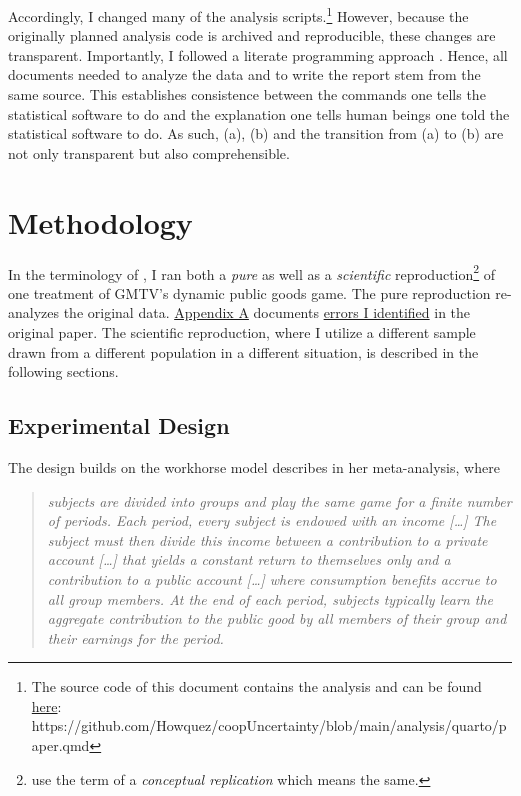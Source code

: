 \documentclass[
  authoryear,
  preprint,
  3p]{elsarticle}
\begin{document}
Accordingly, I changed many of the analysis scripts.\footnote{The source
  code of this document contains the analysis and can be found
  \href{https://github.com/Howquez/coopUncertainty/blob/main/analysis/quarto/paper.qmd}{here}:
  https://github.com/Howquez/coopUncertainty/blob/main/analysis/quarto/paper.qmd}
However, because the originally planned analysis code is archived and
reproducible, these changes are transparent. Importantly, I followed a
literate programming approach \citep{Knuth_1984, AkhtarYe_2023}. Hence,
all documents needed to analyze the data and to write the report stem
from the same source. This establishes consistence between the commands
one tells the statistical software to do and the explanation one tells
human beings one told the statistical software to do. As such, (a), (b)
and the transition from (a) to (b) are not only transparent but also
comprehensible.

\hypertarget{sec-methods}{%
\section{Methodology}\label{sec-methods}}

In the terminology of \citet{Hamermesh2007}, I ran both a \emph{pure} as
well as a \emph{scientific} reproduction\footnote{\citet{Parsons2022}
  use the term of a \emph{conceptual replication} which means the same.}
of one treatment of GMTV's dynamic public goods game. The pure
reproduction re-analyzes the original data.
\protect\hyperlink{A:-Pure-Replication}{Appendix A} documents
\href{}{errors I identified} in the original paper. The scientific
reproduction, where I utilize a different sample drawn from a different
population in a different situation, is described in the following
sections.

\hypertarget{sec-design}{%
\subsection{Experimental Design}\label{sec-design}}

The design builds on the workhorse model \citet[p.301]{Zelmer2003}
describes in her meta-analysis, where

\begin{quote}
\emph{subjects are divided into groups and play the same game for a
finite number of periods. Each period, every subject is endowed with an
income {[}\ldots{]} The subject must then divide this income between a
contribution to a private account {[}\ldots{]} that yields a constant
return to themselves only and a contribution to a public account
{[}\ldots{]} where consumption benefits accrue to all group members. At
the end of each period, subjects typically learn the aggregate
contribution to the public good by all members of their group and their
earnings for the period.}
\end{quote}
\end{document}
